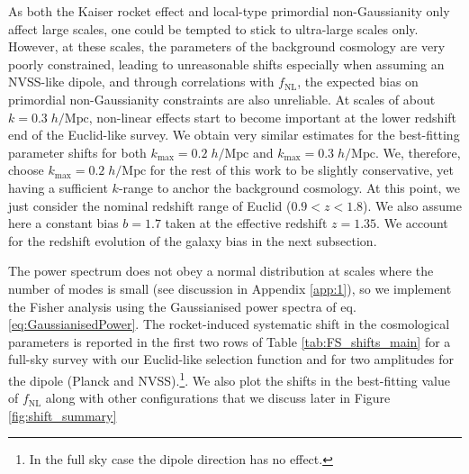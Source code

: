 \documentclass[a4paper,11pt]{article}
\begin{document}
As both the Kaiser rocket effect and local-type primordial non-Gaussianity only affect large scales, one could be tempted to stick to ultra-large scales only. However, at these scales, the parameters of the background cosmology are very poorly constrained, leading to unreasonable shifts especially when assuming an NVSS-like dipole, and through correlations with $f_\mathrm{NL}$, the expected bias on primordial non-Gaussianity constraints are also unreliable. At scales of about $k=0.3\;h/\mathrm{Mpc}$, non-linear effects start to become important at the lower redshift end of the Euclid-like survey.  We obtain very similar estimates for the best-fitting parameter shifts for both $k_\mathrm{max}=0.2\;h/\mathrm{Mpc}$ and $k_\mathrm{max}=0.3\;h/\mathrm{Mpc}$. We, therefore, choose $k_\mathrm{max}=0.2\;h/\mathrm{Mpc}$ for the rest of this work to be slightly conservative, yet having a sufficient $k$-range to anchor the background cosmology. At this point, we just consider the nominal redshift range of Euclid ($0.9<z<1.8$). We also assume here a constant bias $b = 1.7$ taken at the effective redshift $z=1.35$. We account for the redshift evolution of the galaxy bias in the next subsection.

The power spectrum does not obey a normal distribution at scales where the number of modes is small (see discussion in Appendix \ref{app:1}), so we implement the Fisher analysis using the Gaussianised power spectra of eq. \eqref{eq:GaussianisedPower}. The rocket-induced systematic shift in the cosmological parameters is reported in the first two rows of Table \ref{tab:FS_shifts_main} for a full-sky survey with our Euclid-like selection function and for two amplitudes for the dipole (Planck and NVSS).\footnote{In the full sky case the dipole direction has no effect.}. We also plot the shifts in the best-fitting value of $f_\mathrm{NL}$ along with other configurations that we discuss later in Figure \ref{fig:shift_summary}
\end{document}
